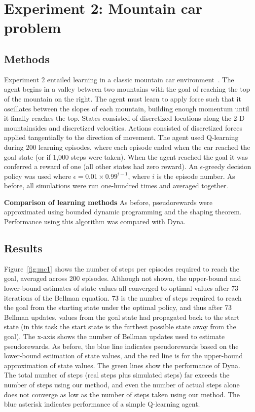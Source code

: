 \documentclass[letterpaper]{article}
\begin{document}
\section{Experiment 2: Mountain car problem}

\subsection{Methods}

Experiment 2 entailed learning in a classic mountain car environment~\cite{moore1990efficient, sutton1996generalization, sutton1998reinforcement, smart2000practical, rasmussen2003gaussian, whiteson2006evolutionary, heidrich2008variable, sutton2012dyna}. The agent begins in a valley between two mountains with the goal of reaching the top of the mountain on the right. The agent must learn to apply force such that it oscillates between the slopes of each mountain, building enough momentum until it finally reaches the top. States consisted of discretized locations along the 2-D mountainsides and discretized velocities. Actions consisted of discretized forces applied tangentially to the direction of movement. The agent used Q-learning during 200 learning episodes, where each episode ended when the car reached the goal state (or if 1,000 steps were taken). When the agent reached the goal it was conferred a reward of one (all other states had zero reward). An $\epsilon$-greedy decision policy was used where $\epsilon=0.01\times0.99^{i-1}$, where $i$ is the episode number. As before, all simulations were run one-hundred times and averaged together.

\noindent
\textbf{Comparison of learning methods} As before, pseudorewards were approximated using bounded dynamic programming and the shaping theorem. Performance using this algorithm was compared with Dyna.

\subsection{Results}

Figure~\ref{fig:mc1} shows the number of steps per episodes required to reach the goal, averaged across 200 episodes. Although not shown, the upper-bound and lower-bound estimates of state values all converged to optimal values after 73 iterations of the Bellman equation. 73 is the number of steps required to reach the goal from the starting state under the optimal policy, and thus after 73 Bellman updates, values from the goal state had propagated back to the start state (in this task the start state is the furthest possible state away from the goal). The x-axis shows the number of Bellman updates used to estimate pseudorewards. As before, the blue line indicates pseudorewards based on the lower-bound estimation of state values, and the red line is for the upper-bound approximation of state values. The green lines show the performance of Dyna. The total number of steps (real steps plus simulated steps) far exceeds the number of steps using our method, and even the number of actual steps alone does not converge as low as the number of steps taken using our method. The blue asterisk indicates performance of a simple Q-learning agent.
\end{document}
